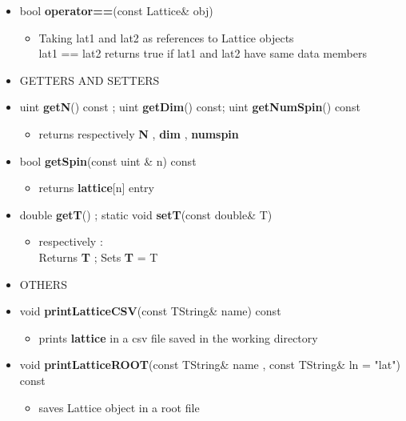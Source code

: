 \begin{itemize}
\begin{itemize}
			\item[] bool \textbf{operator==}(const Lattice\& obj) 		 
			\begin{itemize}
				\item[] Taking \textsf{lat1} and \textsf{lat2} as references to Lattice objects \\
						\textsf{lat1 == lat2} returns true if \textsf{lat1} and \textsf{lat2} have same data members
			\end{itemize}
			
			
		\item[] 
		GETTERS AND SETTERS \\
					
			\item[] uint \textbf{getN}() const ; uint \textbf{getDim}() const; uint \textbf{getNumSpin}() const 	
			\begin{itemize}
			\item[] returns respectively \textbf{N} , \textbf{dim} , \textbf{num\textunderscore spin} 
			\end{itemize}			
			
			\item[] bool \textbf{getSpin}(const uint \& n) const 		 
			\begin{itemize}
				\item[] returns \textbf{lattice}[n] entry
			\end{itemize}
					
			\item[] double \textbf{getT}() ; static void \textbf{setT}(const double\& \textunderscore T)	
			\begin{itemize}
				\item[] respectively : \\ 
						Returns \textbf{T} ; Sets \textbf{T} = \textunderscore T \\
			\end{itemize}
			
		\item[] 
		OTHERS \\
			
			\item[] void \textbf{printLatticeCSV}(const TString\& name) const		 
			\begin{itemize}
				\item[] prints \textbf{lattice} in a csv file saved in the working directory
			\end{itemize}
			
			\item[] 
			{\small			
			void \textbf{printLatticeROOT}(const TString\& name , const TString\& ln = "lat") const	
			}			
			\begin{itemize}
				\item[] saves Lattice object in a root file 
			\end{itemize}
			
	\end{itemize}

	
\end{itemize}

